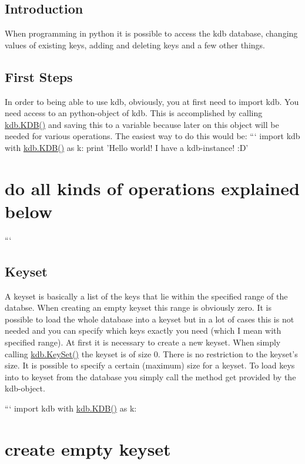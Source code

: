 \subsection*{Introduction}

When programming in python it is possible to access the kdb database, changing values of existing keys, adding and deleting keys and a few other things.

\subsection*{First Steps}

In order to being able to use kdb, obviously, you at first need to {\ttfamily import kdb}. You need access to an python-\/object of kdb. This is accomplished by calling {\ttfamily \hyperlink{classkdb_1_1KDB}{kdb.\+K\+D\+B()}} and saving this to a variable because later on this object will be needed for various operations. The easiest way to do this would be\+: ``` import kdb with \hyperlink{classkdb_1_1KDB}{kdb.\+K\+D\+B()} as k\+: print 'Hello world! I have a kdb-\/instance! \+:D' \section*{do all kinds of operations explained below}

```

\subsection*{Keyset}

A keyset is basically a list of the keys that lie within the specified range of the databse. When creating an empty keyset this range is obviously zero. It is possible to load the whole database into a keyset but in a lot of cases this is not needed and you can specify which keys exactly you need (which I mean with specified range). At first it is necessary to create a new keyset. When simply calling {\ttfamily \hyperlink{classkdb_1_1KeySet}{kdb.\+Key\+Set()}} the keyset is of size 0. There is no restriction to the keyset's size. It is possible to specify a certain (maximum) size for a keyset. To load keys into to keyset from the database you simply call the method {\ttfamily get} provided by the kdb-\/object.

``` import kdb with \hyperlink{classkdb_1_1KDB}{kdb.\+K\+D\+B()} as k\+: \section*{create empty keyset}


